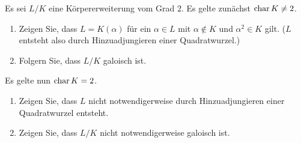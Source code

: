 \begin{question}[subtitle = Quadratische Körpererweiterungen]
  \label{question: quadratic field extensions}
  Es sei $L/K$ eine Körpererweiterung vom Grad $2$.
  Es gelte zunächst $\operatorname{char} K \neq 2$.
  \begin{enumerate}
    \item
      Zeigen Sie, dass $L = K(\alpha)$ für ein $\alpha \in L$ mit $\alpha \notin K$ und $\alpha^2 \in K$ gilt.
      ($L$ entsteht also durch Hinzuadjungieren einer Quadratwurzel.)
    \item
      Folgern Sie, dass $L/K$ galoisch ist.
  \end{enumerate}
  Es gelte nun $\operatorname{char} K = 2$.
  \begin{enumerate}[resume]
    \item
      Zeigen Sie, dass $L$ nicht notwendigerweise durch Hinzuadjungieren einer Quadratwurzel entsteht.
    \item
      Zeigen Sie, dass $L/K$ nicht notwendigerweise galoisch ist.
  \end{enumerate}
\end{question}



